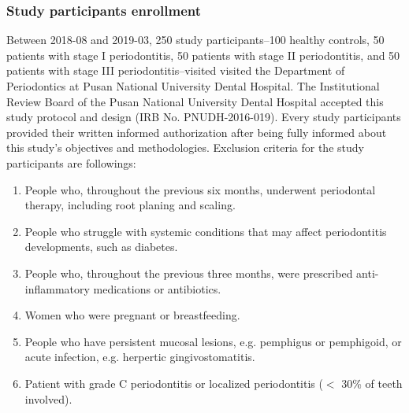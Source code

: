 \documentclass[11pt, a4paper, onecolumn, oneside]{report}
\begin{document}
            \subsubsection{Study participants enrollment}
                Between 2018-08 and 2019-03, 250 study participants--100 healthy controls, 50 patients with stage I periodontitis, 50 patients with stage II periodontitis, and 50 patients with stage III periodontitis--visited visited the Department of Periodontics at Pusan National University Dental Hospital. The Institutional Review Board of the Pusan National University Dental Hospital accepted this study protocol and design (IRB No. PNUDH-2016-019). Every study participants provided their written informed authorization after being fully informed about this study's objectives and methodologies. Exclusion criteria for the study participants are followings:
                \begin{enumerate}
                    \item People who, throughout the previous six months, underwent periodontal therapy, including root planing and scaling.
                    \item People who struggle with systemic conditions that may affect periodontitis developments, such as diabetes.
                    \item People who, throughout the previous three months, were prescribed anti-inflammatory medications or antibiotics.
                    \item Women who were pregnant or breastfeeding.
                    \item People who have persistent mucosal lesions, e.g. pemphigus or pemphigoid, or acute infection, e.g. herpertic gingivostomatitis.
                    \item Patient with grade C periodontitis or localized periodontitis ($<$ 30\% of teeth involved).
                \end{enumerate}
\end{document}
